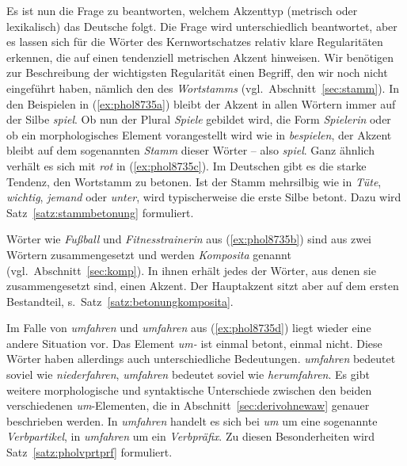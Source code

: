 Es ist nun die Frage zu beantworten, welchem Akzenttyp (metrisch oder lexikalisch) das Deutsche folgt.
Die Frage wird unterschiedlich beantwortet, aber es lassen sich für die Wörter des Kernwortschatzes relativ klare Regularitäten erkennen, die auf einen tendenziell metrischen Akzent hinweisen.
Wir benötigen zur Beschreibung der wichtigsten Regularität einen Begriff, den wir noch nicht eingeführt haben, nämlich den des \label{abs:3453457}\textit{Wortstamms} (vgl.\ Abschnitt~\ref{sec:stamm}).
In den Beispielen in (\ref{ex:phol8735a}) bleibt der Akzent in allen Wörtern immer auf der Silbe \textit{spiel}.
Ob nun der Plural \textit{Spiele} gebildet wird, die Form \textit{Spielerin} oder ob ein morphologisches Element vorangestellt wird wie in \textit{bespielen}, der Akzent bleibt auf dem sogenannten \textit{Stamm} dieser Wörter -- also \textit{spiel}.
Ganz ähnlich verhält es sich mit \textit{rot} in (\ref{ex:phol8735c}).
Im Deutschen gibt es die starke Tendenz, den Wortstamm zu betonen.
Ist der Stamm mehrsilbig wie in \textit{Tüte}, \textit{wichtig}, \textit{jemand} oder \textit{unter}, wird typischerweise die erste Silbe betont.
Dazu wird Satz~\ref{satz:stammbetonung} formuliert.


Wörter wie \textit{Fußball} und \textit{Fitnesstrainerin} aus (\ref{ex:phol8735b}) sind aus zwei Wörtern zusammengesetzt und werden \textit{Komposita} genannt (vgl.\ Abschnitt~\ref{sec:komp}).
In ihnen erhält jedes der Wörter, aus denen sie zusammengesetzt sind, einen Akzent.
Der Hauptakzent sitzt aber auf dem ersten Bestandteil, s.\ Satz~\ref{satz:betonungkomposita}.



Im Falle von \textit{\Akz umfahren} und \textit{um\Akz fahren} aus (\ref{ex:phol8735d}) liegt wieder eine andere Situation vor.
Das Element \textit{um-} ist einmal betont, einmal nicht.
Diese Wörter haben allerdings auch unterschiedliche Bedeutungen.
\textit{\Akz umfahren} bedeutet soviel wie \textit{niederfahren}, \textit{um\Akz fahren} bedeutet soviel wie \textit{herumfahren}.
Es gibt weitere morphologische und syntaktische Unterschiede zwischen den beiden verschiedenen \textit{um}-Elementen, die in Abschnitt~\ref{sec:derivohnewaw} genauer beschrieben werden.
In \textit{\Akz umfahren} handelt es sich bei \textit{um} um eine sogenannte \textit{Verbpartikel}, in \textit{um\Akz fahren} um ein \textit{Verbpräfix}.
Zu diesen Besonderheiten wird Satz~\ref{satz:pholvprtprf} formuliert.


